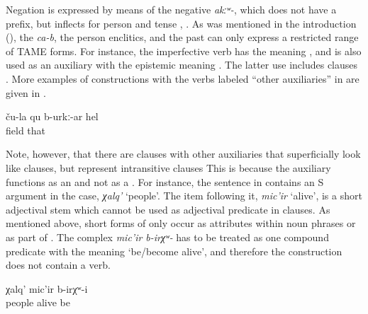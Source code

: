 Negation is expressed by means of the negative  \textit{akːʷ-}, which does not have a  prefix, but inflects for person and tense , . As was mentioned in the introduction (), the  \textit{ca-b}, the person enclitics, and the past  can only express a restricted range of TAME forms. For instance, the imperfective verb  has the meaning , and is also used as an auxiliary with the epistemic meaning . The latter use includes  clauses . More examples of  constructions with the verbs labeled ``other auxiliaries'' in  are given in .

 \begin{exe}
 \ex	\label{That is probably their field.}
\gll ču-la	qu	b-urkː-ar	hel	\\
	field		that	\\
 \glt	{}
\end{exe}

Note, however, that there are clauses with other auxiliaries that superficially look like  clauses, but represent intransitive clauses This is because the auxiliary functions as an  and not as a . For instance, the sentence in  contains an S argument in the  case, \textit{χalq'} `people'. The item following it, \textit{mic'ir} `alive', is a short adjectival stem which cannot be used as adjectival predicate in  clauses. As mentioned above, short forms of  only occur as attributes within noun phrases or as part of . The complex  \textit{mic'ir	b-irχʷ-} has to be treated as one compound predicate with the meaning `be\slash become alive', and therefore the construction does not contain a  verb.
 
 \begin{exe}
	\ex	\label{ex:peopleusedtobealive}
	\gll	χalq'	mic'ir	b-irχʷ-i\\
		people	alive	be\\
	\glt	{}
\end{exe}


